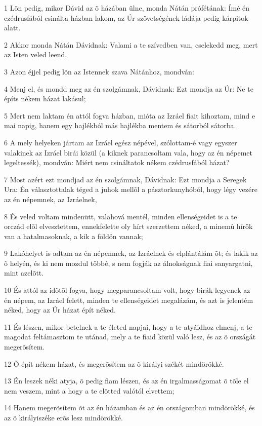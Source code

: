 \par 1 Lõn pedig, mikor Dávid az õ házában ülne, monda Nátán prófétának: Ímé én czédrusfából csinálta házban lakom, az Úr  szövetségének ládája pedig kárpitok alatt.
\par 2 Akkor monda Nátán Dávidnak: Valami a te szívedben van, cselekedd meg, mert az Isten veled leend.
\par 3 Azon éjjel pedig lõn az Istennek szava Nátánhoz, mondván:
\par 4 Menj el, és mondd meg az én szolgámnak, Dávidnak: Ezt mondja az Úr: Ne te építs nékem házat lakásul;
\par 5 Mert nem laktam én attól fogva házban, mióta az Izráel fiait kihoztam, mind e mai napig, hanem egy hajlékból más hajlékba mentem és sátorból sátorba.
\par 6 A mely helyeken jártam az Izráel egész népével, szólottam-é vagy egyszer valakinek az Izráel birái közül (a kiknek parancsoltam vala, hogy az én népemet legeltessék), mondván: Miért nem csináltatok nékem czédrusfából házat?
\par 7 Most azért ezt mondjad az én szolgámnak, Dávidnak: Ezt mondja a Seregek Ura: Én választottalak téged a juhok mellõl a pásztorkunyhóból, hogy légy vezére az én népemnek, az Izráelnek,
\par 8 És veled voltam mindenütt, valahová mentél, minden ellenségeidet is a te orczád elõl elvesztettem, ennekfelette oly hírt szerzettem néked, a minemû hírök van a hatalmasoknak, a kik a földön vannak;
\par 9 Lakóhelyet is adtam az én népemnek, az Izráelnek és elplántálám õt; és lakik az õ helyén, és ki nem mozdul többé,  s nem fogják az álnokságnak fiai sanyargatni, mint azelõtt.
\par 10 És attól az idõtõl fogva, hogy megparancsoltam volt, hogy birák legyenek az én népem, az Izráel felett, minden te ellenségeidet megalázám, és azt is jelentém néked, hogy az Úr házat épít néked.
\par 11 És lészen, mikor betelnek a te életed napjai, hogy a te atyáidhoz elmenj, a te magodat feltámasztom te utánad, mely a te fiaid közül való lesz, és az õ országát megerõsítem.
\par 12 Õ épít nékem házat, és megerõsítem az õ királyi székét mindörökké.
\par 13 Én leszek néki atyja, õ pedig fiam lészen, és az én irgalmasságomat õ tõle el nem veszem, mint a hogy a te elõtted  valótól elvettem;
\par 14 Hanem megerõsítem õt az én házamban és az én országomban mindörökké, és az õ királyiszéke erõs lesz mindörökké.
